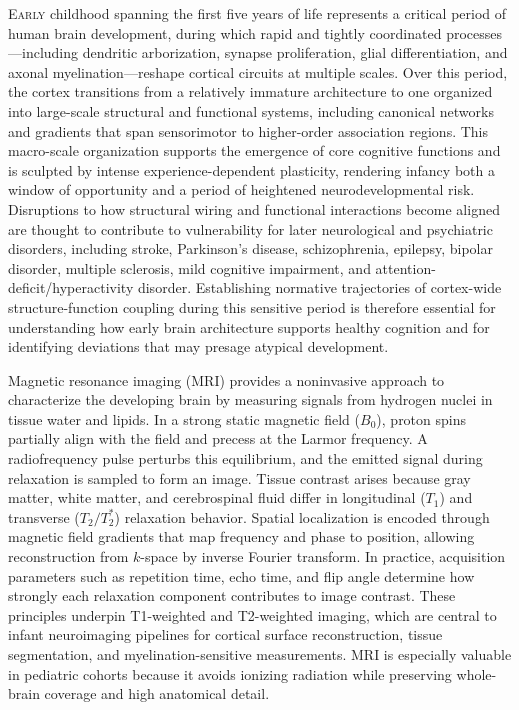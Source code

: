\lettrine{E}{arly} childhood spanning the first five years of life represents a critical period of human brain development, during which rapid and tightly coordinated processes---including dendritic arborization, synapse proliferation, glial differentiation, and axonal myelination---reshape cortical circuits at multiple scales\cite{petanjekExtraordinaryNeotenySynaptic2011,xiaDevelopmentSensorimotorvisualConnectome2024,tooleyStructureFunctionCoupling2025}. Over this period, the cortex transitions from a relatively immature architecture to one organized into large-scale structural and functional systems, including canonical networks and gradients that span sensorimotor to higher-order association regions\cite{xuStructuralConnectivityMatures2024,babaeeghazviniBrainStructuralFunctional2021}. This macro-scale organization supports the emergence of core cognitive functions and is sculpted by intense experience-dependent plasticity, rendering infancy both a window of opportunity and a period of heightened neurodevelopmental risk\cite{zhangDynamicStructureFunction2024}. Disruptions to how structural wiring and functional interactions become aligned are thought to contribute to vulnerability for later neurological and psychiatric disorders, including stroke, Parkinson's disease, schizophrenia, epilepsy, bipolar disorder, multiple sclerosis, mild cognitive impairment, and attention-deficit/hyperactivity disorder\cite{gonzalez-ramirezBiologicallyConstrainedMathematical2015,parkConnectomewideStructurefunctionCoupling2023,somanCorticalStructuralFunctional2023,chiangStructuralFunctionalCoupling2015,sunModularlevelAlterationsStructure2017}. Establishing normative trajectories of cortex-wide structure-function coupling during this sensitive period is therefore essential for understanding how early brain architecture supports healthy cognition and for identifying deviations that may presage atypical development.

Magnetic resonance imaging (MRI) provides a noninvasive approach to characterize the developing brain by measuring signals from hydrogen nuclei in tissue water and lipids. In a strong static magnetic field (\(B_0\)), proton spins partially align with the field and precess at the Larmor frequency. A radiofrequency pulse perturbs this equilibrium, and the emitted signal during relaxation is sampled to form an image. Tissue contrast arises because gray matter, white matter, and cerebrospinal fluid differ in longitudinal (\(T_1\)) and transverse (\(T_2/T_2^*\)) relaxation behavior. Spatial localization is encoded through magnetic field gradients that map frequency and phase to position, allowing reconstruction from \(k\)-space by inverse Fourier transform. In practice, acquisition parameters such as repetition time, echo time, and flip angle determine how strongly each relaxation component contributes to image contrast. These principles underpin T1-weighted and T2-weighted imaging, which are central to infant neuroimaging pipelines for cortical surface reconstruction, tissue segmentation, and myelination-sensitive measurements. MRI is especially valuable in pediatric cohorts because it avoids ionizing radiation while preserving whole-brain coverage and high anatomical detail\cite{westbrookMRIPractice6th}.

